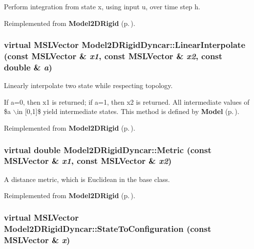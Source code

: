 Perform integration from state x, using input u, over time step h.



Reimplemented from {\bf Model2DRigid} {\rm (p.\,\pageref{class_Model2DRigid_a2})}.
\subsubsection{\setlength{\rightskip}{0pt plus 5cm}virtual {\bf MSLVector} Model2DRigid\-Dyncar::Linear\-Interpolate (const {\bf MSLVector} \& {\em x1}, const {\bf MSLVector} \& {\em x2}, const double \& {\em a})\hspace{0.3cm}{\tt  [virtual]}}\label{class_Model2DRigidDyncar_a6}


Linearly interpolate two state while respecting topology.

If a=0, then x1 is returned; if a=1, then x2 is returned. All intermediate values of \$a $\backslash$in [0,1]\$ yield intermediate states. This method is defined by {\bf Model} {\rm (p.\,\pageref{class_Model})}. 

Reimplemented from {\bf Model2DRigid} {\rm (p.\,\pageref{class_Model2DRigid_a4})}.
\subsubsection{\setlength{\rightskip}{0pt plus 5cm}virtual double Model2DRigid\-Dyncar::Metric (const {\bf MSLVector} \& {\em x1}, const {\bf MSLVector} \& {\em x2})\hspace{0.3cm}{\tt  [virtual]}}\label{class_Model2DRigidDyncar_a5}


A distance metric, which is Euclidean in the base class.



Reimplemented from {\bf Model2DRigid} {\rm (p.\,\pageref{class_Model2DRigid_a5})}.
\subsubsection{\setlength{\rightskip}{0pt plus 5cm}virtual {\bf MSLVector} Model2DRigid\-Dyncar::State\-To\-Configuration (const {\bf MSLVector} \& {\em x})\hspace{0.3cm}{\tt  [virtual]}}\label{class_Model2DRigidDyncar_a3}


